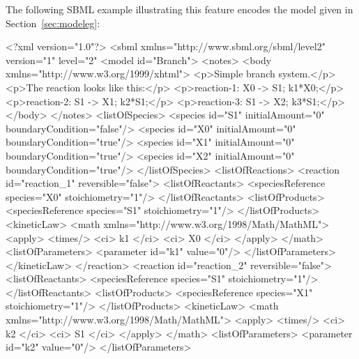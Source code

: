 \documentclass[10pt,twocolumntoc]{cekarticle}
\begin{document}
The following SBML example illustrating this feature encodes the model
given in Section~\ref{sec:modeleg}:
\begin{example}
<?xml version="1.0"?>
<sbml xmlns="http://www.sbml.org/sbml/level2" version="1" level="2"
    <model id="Branch">
        <notes>
            <body xmlns="http://www.w3.org/1999/xhtml">
                <p>Simple branch system.</p>
                <p>The reaction looks like this:</p>
                <p>reaction-1:   X0 -> S1; k1*X0;</p>
                <p>reaction-2:   S1 -> X1; k2*S1;</p>
                <p>reaction-3:   S1 -> X2; k3*S1;</p>
            </body>
        </notes>
        <listOfSpecies>
            <species id="S1" initialAmount="0" boundaryCondition="false"/>
            <species id="X0" initialAmount="0" boundaryCondition="true"/>
            <species id="X1" initialAmount="0" boundaryCondition="true"/>
            <species id="X2" initialAmount="0" boundaryCondition="true"/>
        </listOfSpecies>
        <listOfReactions>
            <reaction id="reaction_1" reversible="false">
                <listOfReactants>
                    <speciesReference species="X0" stoichiometry="1"/>
                </listOfReactants>
                <listOfProducts>
                    <speciesReference species="S1" stoichiometry="1"/>
                </listOfProducts>
                <kineticLaw>
                    <math xmlns="http://www.w3.org/1998/Math/MathML">
                        <apply>
                            <times/>
                            <ci> k1 </ci>
                            <ci> X0 </ci>
                        </apply>
                    </math>
                    <listOfParameters>
                        <parameter id="k1" value="0"/>
                    </listOfParameters>
                </kineticLaw>
            </reaction>
            <reaction id="reaction_2" reversible="false">
                <listOfReactants>
                    <speciesReference species="S1" stoichiometry="1"/>
                </listOfReactants>
                <listOfProducts>
                    <speciesReference species="X1" stoichiometry="1"/>
                </listOfProducts>
                <kineticLaw>
                    <math xmlns="http://www.w3.org/1998/Math/MathML">
                        <apply>
                            <times/>
                            <ci> k2 </ci>
                            <ci> S1 </ci>
                        </apply>
                    </math>
                    <listOfParameters>
                        <parameter id="k2" value="0"/>
                    </listOfParameters>

\end{example}
\end{document}
